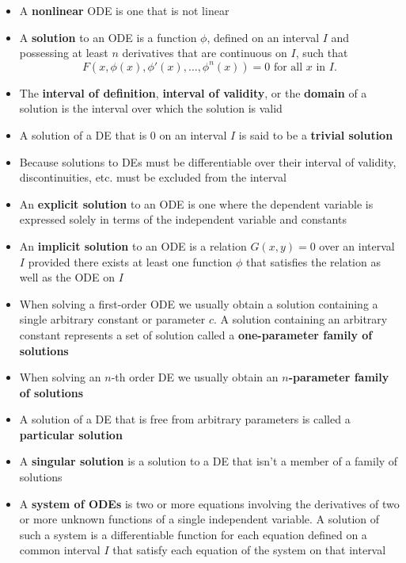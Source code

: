\documentclass{article}
\begin{document}
\begin{itemize}
  \item A \textbf{nonlinear} ODE is one that is not linear

  \item A \textbf{solution} to an ODE is a function $\phi$, defined on an interval $I$ and possessing at least $n$ derivatives that are continuous on $I$, such that \[F(x, \phi(x), \phi'(x), \ldots, \phi^{n}(x)) = 0 \text{ for all } x \text{ in } I.\]

  \item The \textbf{interval of definition}, \textbf{interval of validity}, or the \textbf{domain} of a solution is the interval over which the solution is valid

  \item A solution of a DE that is $0$ on an interval $I$ is said to be a \textbf{trivial solution}

  \item Because solutions to DEs must be differentiable over their interval of validity, discontinuities, etc. must be excluded from the interval

  \item An \textbf{explicit solution} to an ODE is one where the dependent variable is expressed solely in terms of the independent variable and constants

  \item An \textbf{implicit solution} to an ODE is a relation $G(x, y) = 0$ over an interval $I$ provided there exists at least one function $\phi$ that satisfies the relation as well as the ODE on $I$

  \item When solving a first-order ODE we usually obtain a solution containing a single arbitrary constant or parameter $c$. A solution containing an arbitrary constant represents a set of solution called a \textbf{one-parameter family of solutions}

  \item When solving an $n$-th order DE we usually obtain an \textbf{$n$-parameter family of solutions}

  \item A solution of a DE that is free from arbitrary parameters is called a \textbf{particular solution}

  \item A \textbf{singular solution} is a solution to a DE that isn't a member of a family of solutions

  \item A \textbf{system of ODEs} is two or more equations involving the derivatives of two or more unknown functions of a single independent variable. A solution of such a system is a differentiable function for each equation defined on a common interval $I$ that satisfy each equation of the system on that interval
\end{itemize}
\end{document}
